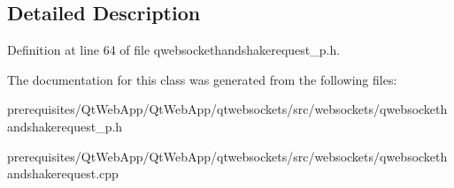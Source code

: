 \subsection{Detailed Description}


Definition at line 64 of file qwebsockethandshakerequest\+\_\+p.\+h.



The documentation for this class was generated from the following files\+:\begin{DoxyCompactItemize}
\item 
prerequisites/\+Qt\+Web\+App/\+Qt\+Web\+App/qtwebsockets/src/websockets/qwebsockethandshakerequest\+\_\+p.\+h\item 
prerequisites/\+Qt\+Web\+App/\+Qt\+Web\+App/qtwebsockets/src/websockets/qwebsockethandshakerequest.\+cpp\end{DoxyCompactItemize}
